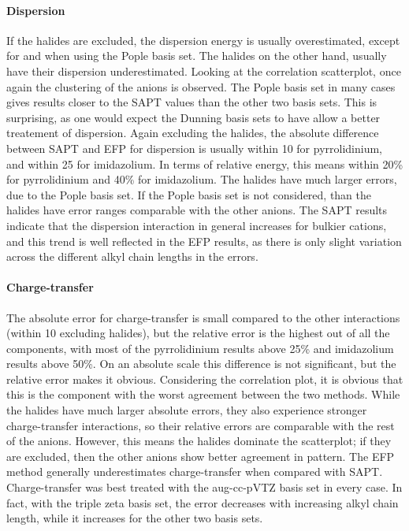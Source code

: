 \begin{multicols}{2}
\paragraph{Dispersion}
If the halides are excluded, the dispersion energy is usually overestimated, except for \bfl and \pf when using the Pople basis set. 
The halides on the other hand, usually have their dispersion underestimated.
Looking at the correlation scatterplot, once again the clustering of the anions is observed.
The Pople basis set in many cases gives results closer to the SAPT values than the other two basis sets.
This is surprising, as one would expect the Dunning basis sets to have allow a better treatement of dispersion.
Again excluding the halides, the absolute difference between SAPT and EFP for dispersion is usually within 10 \enUnit for pyrrolidinium, and within 25 \enUnit for imidazolium.
In terms of relative energy, this means within 20\% for pyrrolidinium and 40\% for imidazolium.
The halides have much larger errors, due to the Pople basis set. 
If the Pople basis set is not considered, than the halides have error ranges comparable with the other anions.
The SAPT results indicate that the dispersion interaction in general increases for bulkier cations, and this trend is well reflected in the EFP results, as there is only slight variation across the different alkyl chain lengths in the errors. 


\paragraph{Charge-transfer}
The absolute error for charge-transfer is small compared to the other interactions (within 10 \enUnit excluding halides), but the relative error is the highest out of all the components, with most of the pyrrolidinium results above 25\% and imidazolium results above 50\%.
On an absolute scale this difference is not significant, but the relative error makes it obvious.
Considering the correlation plot, it is obvious that this is the component with the worst agreement between the two methods.
While the halides have much larger absolute errors, they also experience stronger charge-transfer interactions, so their relative errors are comparable with the rest of the anions.
However, this means the halides dominate the scatterplot; if they are excluded, then the other anions show better agreement in pattern.
The EFP method generally underestimates charge-transfer when compared with SAPT.
Charge-transfer was best treated with the aug-cc-pVTZ basis set in every case.
In fact, with the triple zeta basis set, the error decreases with increasing alkyl chain length, while it increases for the other two basis sets.



\end{multicols}
